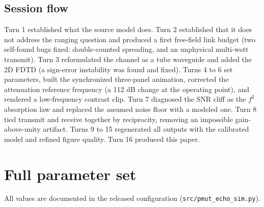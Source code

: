 \subsection{Session flow}
Turn 1 established what the source model does. Turn 2 established that it does not address the
ranging question and produced a first free-field link budget (two self-found bugs fixed:
double-counted spreading, and an unphysical multi-watt transmit). Turn 3 reformulated the
channel as a tube waveguide and added the 2D FDTD (a sign-error instability was found and
fixed). Turns 4 to 6 set parameters, built the synchronized three-panel animation, corrected
the attenuation reference frequency (a 112 dB change at the operating point), and rendered a
low-frequency contrast clip. Turn 7 diagnosed the SNR cliff as the $f^2$ absorption law and
replaced the assumed noise floor with a modeled one. Turn 8 tied transmit and receive together
by reciprocity, removing an impossible gain-above-unity artifact. Turns 9 to 15 regenerated all
outputs with the calibrated model and refined figure quality. Turn 16 produced this paper.

\section{Full parameter set}\label{app:params}
All values are documented in the released configuration (\texttt{src/pmut\_echo\_sim.py}).

